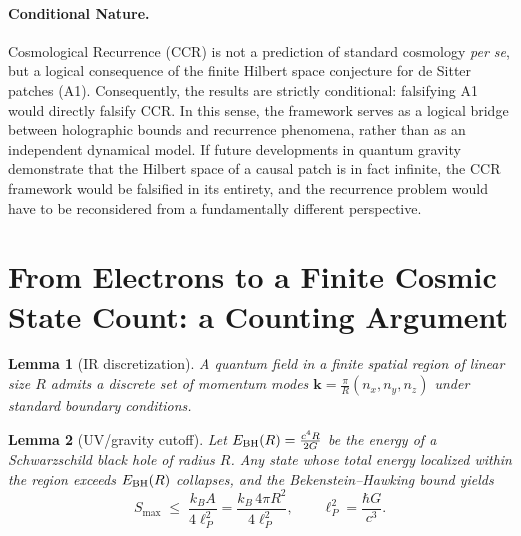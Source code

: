 \documentclass[12pt]{article}
\newcommand{\Smax}{S_{\max}}
\newtheorem{lemma}{Lemma}
\theoremstyle{remark}
\begin{document}
\begin{center}
\end{center}


\paragraph{Conditional Nature.} 
Cosmological Recurrence (CCR) is not a prediction of standard cosmology \emph{per se}, but a logical consequence of the finite Hilbert space conjecture for de Sitter patches (A1). Consequently, the results are strictly conditional: falsifying A1 would directly falsify CCR. In this sense, the framework serves as a logical bridge between holographic bounds and recurrence phenomena, rather than as an independent dynamical model. If future developments in quantum gravity demonstrate that the Hilbert space of a causal patch is in fact infinite, the CCR framework would be falsified in its entirety, and the recurrence problem would have to be reconsidered from a fundamentally different perspective.

\section{From Electrons to a Finite Cosmic State Count: a Counting Argument}
\begin{lemma}[IR discretization]\label{lem:IR}
A quantum field in a finite spatial region of linear size $R$ admits a discrete set of momentum modes
$\mathbf{k}=\frac{\pi}{R}(n_x,n_y,n_z)$ under standard boundary conditions.
\end{lemma}

\begin{lemma}[UV/gravity cutoff]\label{lem:UV}
Let $E_{\rm BH}(R)=\frac{c^4 R}{2G}$ be the energy of a Schwarzschild black hole of radius $R$. 
Any state whose total energy localized within the region exceeds $E_{\rm BH}(R)$ collapses, and the
Bekenstein--Hawking bound yields
\begin{equation}
\Smax\;\le\; \frac{k_B A}{4\ell_P^2}
=\frac{k_B\,4\pi R^2}{4\ell_P^2},\qquad \ell_P^2=\frac{\hbar G}{c^3}.
\end{equation}
\end{lemma}
\end{document}
